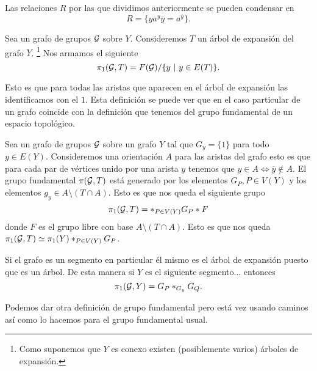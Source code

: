 \documentclass[tesis.tex]{subfiles}
\begin{document}
\begin{obs}
	Las relaciones $R$ por las que dividimos anteriormente se pueden condensar en 
	\[
	R = \{  ya^y \overline y = a^{\overline y}  \}.
	\]
\end{obs}

\begin{deff} \label{def_pi1_arbol}
	Sea un grafo de grupos $\cal G$ sobre $Y$.
	Consideremos $T$ un árbol de expansión del grafo $Y$.
	\footnote{Como suponemos que $Y$ es conexo existen (posiblemente varios) árboles de expansión.}
	Nos armamos el siguiente 
	\begin{equation*}
		\pi_1({\cal G}, T) = F({\cal G}) / \{ y \  | \ y \in E(T)  \}.
	\end{equation*}
\end{deff}

Esto es que para todas las aristas que aparecen en el árbol de expansión las identificamos con el $1$. 
Esta definición se puede ver que en el caso particular de un grafo coincide con la definición que tenemos del grupo fundamental de un espacio topológico.

\begin{ej}
	Sea un grafo de grupos $\cal G$ sobre un grafo $Y$ tal que $G_y = \{ 1 \}$ para todo $y \in E(Y)$.
	Consideremos una orientación $A$ para las aristas del grafo esto es que para cada par de vértices unido por una arista $y$ tenemos que $y \in A \iff \overline y \notin A$.
	El grupo fundamental $\pi({\cal G}, T)$ está generado por los elementos $G_P, P \in V(Y)$ y los elementos $g_y \in A \setminus (T \cap A)$.
	Esto es que nos queda el siguiente grupo
	\[
	\pi_1({\cal G}, T) = \ast_{P \in V(Y)} G_P \ast F
	\]
	donde $F$ es el grupo libre con base $A \setminus (T \cap A)$.
	Esto es que nos queda $\pi_1({\cal G}, T) \simeq \pi_1(Y) \ast_{P \in V(Y)} G_P$.
\end{ej}

\begin{ej}
	Si el grafo es un segmento en particular él mismo es el árbol de expansión puesto que es un árbol.
	De esta manera si $Y$ es el siguiente segmento... 
	entonces
	\[
	\pi_1({\cal G}, Y) = G_P \ast_{G_y} G_Q.
	\]
\end{ej}

Podemos dar otra definición de grupo fundamental pero está vez usando caminos así como lo hacemos para el grupo fundamental usual.
\end{document}
